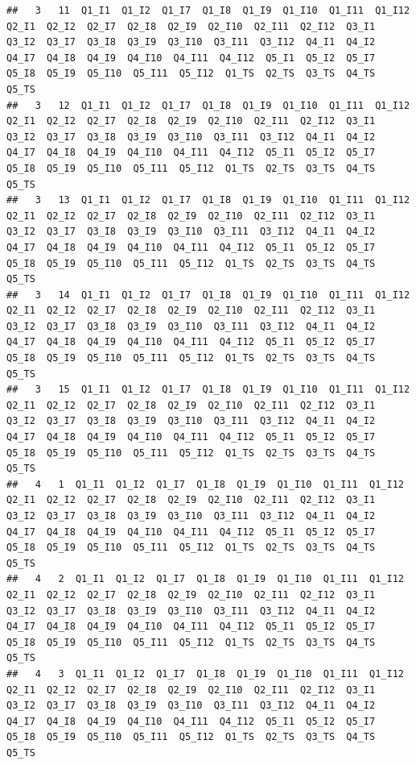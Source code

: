 \documentclass[]{book}
\begin{document}
\begin{verbatim}
##   3   11  Q1_I1  Q1_I2  Q1_I7  Q1_I8  Q1_I9  Q1_I10  Q1_I11  Q1_I12  Q2_I1  Q2_I2  Q2_I7  Q2_I8  Q2_I9  Q2_I10  Q2_I11  Q2_I12  Q3_I1  Q3_I2  Q3_I7  Q3_I8  Q3_I9  Q3_I10  Q3_I11  Q3_I12  Q4_I1  Q4_I2  Q4_I7  Q4_I8  Q4_I9  Q4_I10  Q4_I11  Q4_I12  Q5_I1  Q5_I2  Q5_I7  Q5_I8  Q5_I9  Q5_I10  Q5_I11  Q5_I12  Q1_TS  Q2_TS  Q3_TS  Q4_TS  Q5_TS
##   3   12  Q1_I1  Q1_I2  Q1_I7  Q1_I8  Q1_I9  Q1_I10  Q1_I11  Q1_I12  Q2_I1  Q2_I2  Q2_I7  Q2_I8  Q2_I9  Q2_I10  Q2_I11  Q2_I12  Q3_I1  Q3_I2  Q3_I7  Q3_I8  Q3_I9  Q3_I10  Q3_I11  Q3_I12  Q4_I1  Q4_I2  Q4_I7  Q4_I8  Q4_I9  Q4_I10  Q4_I11  Q4_I12  Q5_I1  Q5_I2  Q5_I7  Q5_I8  Q5_I9  Q5_I10  Q5_I11  Q5_I12  Q1_TS  Q2_TS  Q3_TS  Q4_TS  Q5_TS
##   3   13  Q1_I1  Q1_I2  Q1_I7  Q1_I8  Q1_I9  Q1_I10  Q1_I11  Q1_I12  Q2_I1  Q2_I2  Q2_I7  Q2_I8  Q2_I9  Q2_I10  Q2_I11  Q2_I12  Q3_I1  Q3_I2  Q3_I7  Q3_I8  Q3_I9  Q3_I10  Q3_I11  Q3_I12  Q4_I1  Q4_I2  Q4_I7  Q4_I8  Q4_I9  Q4_I10  Q4_I11  Q4_I12  Q5_I1  Q5_I2  Q5_I7  Q5_I8  Q5_I9  Q5_I10  Q5_I11  Q5_I12  Q1_TS  Q2_TS  Q3_TS  Q4_TS  Q5_TS
##   3   14  Q1_I1  Q1_I2  Q1_I7  Q1_I8  Q1_I9  Q1_I10  Q1_I11  Q1_I12  Q2_I1  Q2_I2  Q2_I7  Q2_I8  Q2_I9  Q2_I10  Q2_I11  Q2_I12  Q3_I1  Q3_I2  Q3_I7  Q3_I8  Q3_I9  Q3_I10  Q3_I11  Q3_I12  Q4_I1  Q4_I2  Q4_I7  Q4_I8  Q4_I9  Q4_I10  Q4_I11  Q4_I12  Q5_I1  Q5_I2  Q5_I7  Q5_I8  Q5_I9  Q5_I10  Q5_I11  Q5_I12  Q1_TS  Q2_TS  Q3_TS  Q4_TS  Q5_TS
##   3   15  Q1_I1  Q1_I2  Q1_I7  Q1_I8  Q1_I9  Q1_I10  Q1_I11  Q1_I12  Q2_I1  Q2_I2  Q2_I7  Q2_I8  Q2_I9  Q2_I10  Q2_I11  Q2_I12  Q3_I1  Q3_I2  Q3_I7  Q3_I8  Q3_I9  Q3_I10  Q3_I11  Q3_I12  Q4_I1  Q4_I2  Q4_I7  Q4_I8  Q4_I9  Q4_I10  Q4_I11  Q4_I12  Q5_I1  Q5_I2  Q5_I7  Q5_I8  Q5_I9  Q5_I10  Q5_I11  Q5_I12  Q1_TS  Q2_TS  Q3_TS  Q4_TS  Q5_TS
##   4   1  Q1_I1  Q1_I2  Q1_I7  Q1_I8  Q1_I9  Q1_I10  Q1_I11  Q1_I12  Q2_I1  Q2_I2  Q2_I7  Q2_I8  Q2_I9  Q2_I10  Q2_I11  Q2_I12  Q3_I1  Q3_I2  Q3_I7  Q3_I8  Q3_I9  Q3_I10  Q3_I11  Q3_I12  Q4_I1  Q4_I2  Q4_I7  Q4_I8  Q4_I9  Q4_I10  Q4_I11  Q4_I12  Q5_I1  Q5_I2  Q5_I7  Q5_I8  Q5_I9  Q5_I10  Q5_I11  Q5_I12  Q1_TS  Q2_TS  Q3_TS  Q4_TS  Q5_TS
##   4   2  Q1_I1  Q1_I2  Q1_I7  Q1_I8  Q1_I9  Q1_I10  Q1_I11  Q1_I12  Q2_I1  Q2_I2  Q2_I7  Q2_I8  Q2_I9  Q2_I10  Q2_I11  Q2_I12  Q3_I1  Q3_I2  Q3_I7  Q3_I8  Q3_I9  Q3_I10  Q3_I11  Q3_I12  Q4_I1  Q4_I2  Q4_I7  Q4_I8  Q4_I9  Q4_I10  Q4_I11  Q4_I12  Q5_I1  Q5_I2  Q5_I7  Q5_I8  Q5_I9  Q5_I10  Q5_I11  Q5_I12  Q1_TS  Q2_TS  Q3_TS  Q4_TS  Q5_TS
##   4   3  Q1_I1  Q1_I2  Q1_I7  Q1_I8  Q1_I9  Q1_I10  Q1_I11  Q1_I12  Q2_I1  Q2_I2  Q2_I7  Q2_I8  Q2_I9  Q2_I10  Q2_I11  Q2_I12  Q3_I1  Q3_I2  Q3_I7  Q3_I8  Q3_I9  Q3_I10  Q3_I11  Q3_I12  Q4_I1  Q4_I2  Q4_I7  Q4_I8  Q4_I9  Q4_I10  Q4_I11  Q4_I12  Q5_I1  Q5_I2  Q5_I7  Q5_I8  Q5_I9  Q5_I10  Q5_I11  Q5_I12  Q1_TS  Q2_TS  Q3_TS  Q4_TS  Q5_TS

\end{verbatim}
\end{document}
